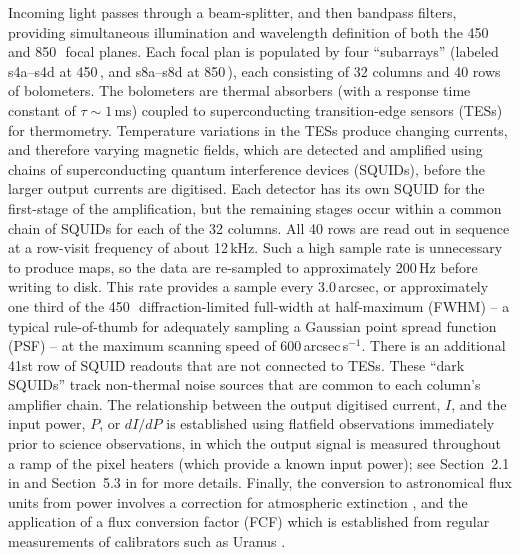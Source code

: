 \documentclass[useAMS,usenatbib,nofootinbib]{mn2e}
\begin{document}
Incoming light passes through a beam-splitter, and then bandpass
filters, providing simultaneous illumination and wavelength definition
of both the 450 and 850\,\micron\ focal planes. Each focal plan is
populated by four ``subarrays'' (labeled s4a--s4d at 450\,\micron, and
s8a--s8d at 850\,\micron), each consisting of 32 columns and 40 rows
of bolometers. The bolometers are thermal absorbers (with a response
time constant of $\tau \sim 1$\,ms) coupled to superconducting
transition-edge sensors (TESs) for thermometry. Temperature variations
in the TESs produce changing currents, and therefore varying magnetic
fields, which are detected and amplified using chains of
superconducting quantum interference devices (SQUIDs), before the
larger output currents are digitised. Each detector has its own SQUID
for the first-stage of the amplification, but the remaining stages
occur within a common chain of SQUIDs for each of the 32 columns. All
40 rows are read out in sequence at a row-visit frequency of about
12\,kHz. Such a high sample rate is unnecessary to produce maps, so
the data are re-sampled to approximately 200\,Hz before writing to
disk. This rate provides a sample every 3.0\,arcsec, or approximately
one third of the 450\,\micron\ diffraction-limited full-width at
half-maximum (FWHM) -- a typical rule-of-thumb for adequately sampling
a Gaussian point spread function (PSF) -- at the maximum scanning
speed of 600\,arcsec\,s$^{-1}$. There is an additional 41st row of
SQUID readouts that are not connected to TESs. These ``dark SQUIDs''
track non-thermal noise sources that are common to each column's
amplifier chain. The relationship between the output digitised
current, $I$, and the input power, $P$, or $dI/dP$ is established
using flatfield observations immediately prior to science
observations, in which the output signal is measured throughout a ramp
of the pixel heaters (which provide a known input power); see
Section~2.1 in \citet{dempsey2012} and Section~5.3 in
\citet{holland2012} for more details. Finally, the conversion to
astronomical flux units from power involves a correction for
atmospheric extinction \citep[primarily using the 183\,GHz (1.6\,mm)
JCMT Water Vapour Monitor to track line-of-sight opacity variations,
see Section~3 in][]{dempsey2012}, and the application of a flux
conversion factor (FCF) which is established from regular measurements
of calibrators such as Uranus \citep[Section~5 in][]{dempsey2012}.
\end{document}
